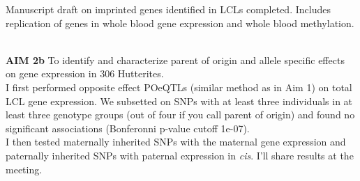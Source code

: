 \documentclass[a4paper, 11pt]{article}
\begin{document}
 	Manuscript draft on imprinted genes identified in LCLs completed. Includes replication of genes in whole blood gene expression and whole blood methylation. 
 
 \textbf{\\AIM 2b} To identify and characterize parent of origin and allele specific effects on gene expression in 306 Hutterites.\\ 
 	
	I first performed opposite effect POeQTLs (similar method as in Aim 1) on total LCL gene expression. We subsetted on SNPs with at least three individuals in at least three genotype groups (out of four if you call parent of origin) and found no significant associations (Bonferonni p-value cutoff 1e-07).\\
	
	I then tested maternally inherited SNPs with the maternal gene expression and paternally inherited SNPs with paternal expression in \textit{cis}. I'll share results at the meeting. \\
	





\end{document}
